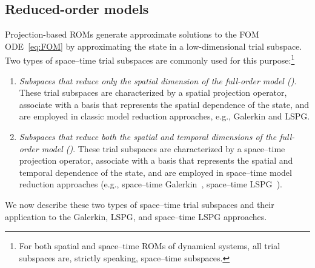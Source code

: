 \documentclass[3p,computermodern,10pt]{elsarticle}
\begin{document}
\subsection{Reduced-order models}
Projection-based ROMs generate approximate solutions to the FOM
	ODE~\eqref{eq:FOM} by approximating the state in a low-dimensional trial
	subspace. Two types of space--time trial subspaces are commonly used for
	this purpose:\footnote{For both spatial and space--time ROMs of dynamical systems, all trial subspaces are, strictly speaking, space--time subspaces.} 
\begin{enumerate} 
	\item \textit{Subspaces that reduce only the spatial dimension of the full-order
		model (\spatialAcronym)}. These trial subspaces are characterized by a spatial projection operator, associate with a basis that represents the spatial dependence of the state, and are employed in classic model reduction approaches, e.g., Galerkin and LSPG. %
	\item \textit{Subspaces that reduce both the spatial and temporal dimensions of the full-order
		model (\spaceTimeAcronym)}.
These trial subspaces are characterized by a space--time projection operator, associate with a basis that represents the spatial and temporal dependence of the state, and are employed in space--time 
model reduction approaches (e.g., space--time Galerkin~\cite{benner_st}, space--time LSPG~\cite{choi_stlspg}). 
\end{enumerate}
 We now describe these two types of space--time trial subspaces and their
	application to the Galerkin, LSPG, and space--time LSPG approaches. 
\end{document}
